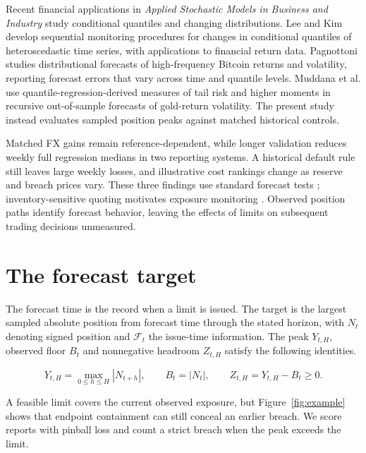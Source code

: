 \documentclass[12pt,a4paper]{article}
\begin{document}
Recent financial applications in \emph{Applied Stochastic Models in Business and Industry} study conditional quantiles and changing distributions. Lee and Kim\cite{LeeKim2024ASMBI} develop sequential monitoring procedures for changes in conditional quantiles of heteroscedastic time series, with applications to financial return data. Pagnottoni\cite{Pagnottoni2026ASMBI} studies distributional forecasts of high-frequency Bitcoin returns and volatility, reporting forecast errors that vary across time and quantile levels. Muddana et al.\cite{MuddanaEtAl2025ASMBI} use quantile-regression-derived measures of tail risk and higher moments in recursive out-of-sample forecasts of gold-return volatility. The present study instead evaluates sampled position peaks against matched historical controls.



Matched FX gains remain reference-dependent, while longer validation reduces weekly full regression medians in two reporting systems. A historical default rule still leaves large weekly losses, and illustrative cost rankings change as reserve and breach prices vary. These three findings use standard forecast tests \cite{dm1995,gw2006,mcs2011}; inventory-sensitive quoting motivates exposure monitoring \cite{avellaneda2008}. Observed position paths identify forecast behavior, leaving the effects of limits on subsequent trading decisions unmeasured.

\FloatBarrier

\section{The forecast target}\label{sec:target}

The forecast time is the record when a limit is issued. The target is the largest sampled absolute position from forecast time through the stated horizon, with \(N_t\) denoting signed position and \(\mathcal F_t\) the issue-time information. The peak \(Y_{t,H}\), observed floor \(B_t\) and nonnegative headroom \(Z_{t,H}\) satisfy the following identities.


\[
Y_{t,H}=\max_{0\le h\le H}|N_{t+h}|,\qquad B_t=|N_t|,\qquad Z_{t,H}=Y_{t,H}-B_t\ge0.
\]

A feasible limit covers the current observed exposure, but Figure~\ref{fig:example} shows that endpoint containment can still conceal an earlier breach. We score reports with pinball loss and count a strict breach when the peak exceeds the limit.
\end{document}
